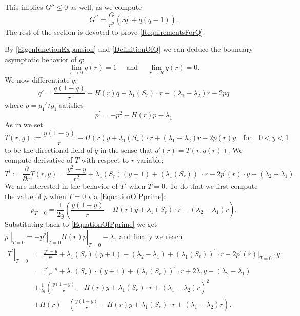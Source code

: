 \documentclass{amsart}
\numberwithin{equation}{section}
\theoremstyle{plain}
\theoremstyle{definition}
\theoremstyle{remark}
\begin{document}
This implies $G''\leq 0$ as well, as we compute 
\[G^{\prime \prime}=\frac{G}{r^2}\left(r q^{\prime}+q(q-1)\right) .\]
The rest of the section is devoted to prove \cref{RequirementsForQ}.
\par By \cref{EigenfunctionExpansion} and \cref{DefinitionOfQ} we can deduce the boundary asymptotic behavior of $q$:
\begin{equation}
\lim _{r \rightarrow 0} q(r)=1 \quad \text { and } \quad \lim _{r \rightarrow R} q(r)=0.
\end{equation}
We now differentiate $q$:
\begin{equation}\label{DerivativeOfQ}
q'=\frac{q(1-q)}{r}-H(r) q+\lambda_1\left(S_r\right) \cdot r+\left(\lambda_1-\lambda_2\right) r-2 p q
\end{equation} where $p= g_1'/g_1$ satisfies
\begin{equation}\label{EquationOfPprime}
p^{\prime}=-p^2-H(r) p-\lambda_1
\end{equation}
As in \cite{benguria2007second} we set
\begin{equation}\label{T r y}
T(r,y):=\frac{y(1-y)}{r}-H(r) y+\lambda_1\left(S_r\right) \cdot r+\left(\lambda_1-\lambda_2\right) r-2 p(r) y \quad \text{for}\quad 0<y<1
\end{equation} to be the directional field of $q$ in the sense that $q'(r)= T(r,q(r)).$
We compute derivative of $T$ with respect to $r$-variable:
\begin{equation}
T^{\prime}:=\frac{\partial}{\partial r} T(r, y)=\frac{y^2-y}{r^2}+\lambda_1\left(S_r\right)(y+1)+\left(\lambda_1\left(S_r\right)\right)^{\prime} \cdot r-2 p^{\prime}(r) \cdot y-\left(\lambda_2-\lambda_1\right).
\end{equation}
We are interested in the behavior of $T'$ when $T= 0$. To do that we first compute the value of $p$ when $T=0$ via \cref{EquationOfPprime}:
\begin{equation}
p_{T=0}=\frac{1}{2 y}\left(\frac{y(1-y)}{r}-H(r) y+\lambda_1\left(S_r\right) \cdot r-\left(\lambda_2-\lambda_1\right) r\right).
\end{equation}
Substituting back to \cref{EquationOfPprime} we get $\left.p^{\prime}\right|_{T=0}=-\left.\left.p^2\right|_{T=0} H(r) p\right|_{T=0}-\lambda_1$ and finally we reach
\begin{equation}\label{T'WhenT=0}
\begin{aligned}
\left.T^{\prime}\right|_{T=0} & =\frac{y^2-y}{r^2}+\lambda_1\left(S_r\right)(y+1)-\left(\lambda_2-\lambda_1\right)+\left(\lambda_1\left(S_r\right)\right)^{\prime} \cdot r-2 p^{\prime}(r)|_{T=0} \cdot y \\
& =\frac{y^2-y}{r^2}+\lambda_1\left(S_r\right) \cdot(y+1)+\left(\lambda_1\left(S_r\right)\right)^{\prime} \cdot r+2 \lambda_1 y-\left(\lambda_2-\lambda_1\right) \\
& +\frac{1}{2 y}\left(\frac{y(1-y)}{r}-H(r) y+\lambda_1\left(S_r\right) \cdot r+\left(\lambda_1-\lambda_2\right) r\right)^2 \\
& +H(r) \quad\left(\frac{y(1-y)}{r}-H(r) y+\lambda_1\left(S_r\right) \cdot r+\left(\lambda_1-\lambda_2\right) r\right).
\end{aligned}
\end{equation}
\end{document}
